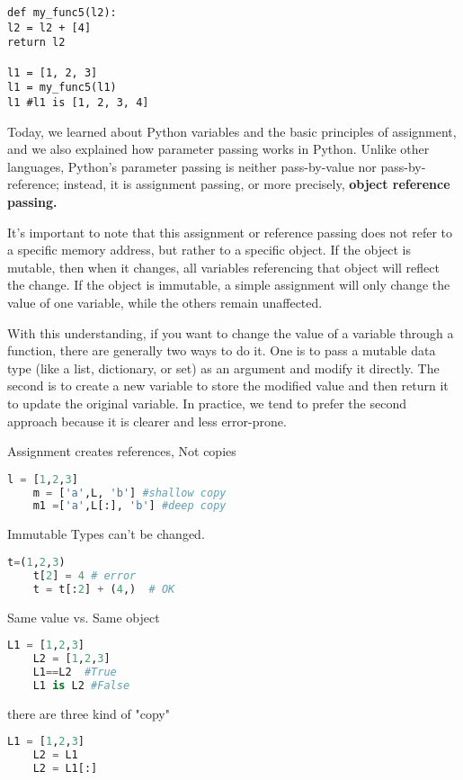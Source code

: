\documentclass[a4paper,12pt,twoside]{book}
\begin{document}
\begin{lstlisting}
def my_func5(l2):
l2 = l2 + [4]
return l2

l1 = [1, 2, 3]
l1 = my_func5(l1)
l1 #l1 is [1, 2, 3, 4]
\end{lstlisting}

Today, we learned about Python variables and the basic principles of assignment, and we also explained how parameter passing works in Python. Unlike other languages, Python’s parameter passing is neither pass-by-value nor pass-by-reference; instead, it is assignment passing, or more precisely, \textbf{object reference passing.}


It’s important to note that this assignment or reference passing does not refer to a specific memory address, but rather to a specific object. If the object is mutable, then when it changes, all variables referencing that object will reflect the change. If the object is immutable, a simple assignment will only change the value of one variable, while the others remain unaffected.


With this understanding, if you want to change the value of a variable through a function, there are generally two ways to do it. One is to pass a mutable data type (like a list, dictionary, or set) as an argument and modify it directly. The second is to create a new variable to store the modified value and then return it to update the original variable. In practice, we tend to prefer the second approach because it is clearer and less error-prone.


Assignment creates references, Not copies
\begin{lstlisting}[frame=single, language=Python]
	l = [1,2,3]
	m = ['a',L, 'b'] #shallow copy
	m1 =['a',L[:], 'b'] #deep copy
\end{lstlisting}  

Immutable Types can't be changed. 
\begin{lstlisting}[frame=single, language=Python]
	t=(1,2,3)
	t[2] = 4 # error
	t = t[:2] + (4,)  # OK
\end{lstlisting}  
Same value vs. Same object
\begin{lstlisting}[frame=single, language=Python]
	L1 = [1,2,3]
	L2 = [1,2,3]
	L1==L2  #True
	L1 is L2 #False
\end{lstlisting}  

there are three kind of "copy"
\begin{lstlisting}[frame=single, language=Python]
	L1 = [1,2,3]
	L2 = L1
	L2 = L1[:]
\end{lstlisting}  
\end{document}
